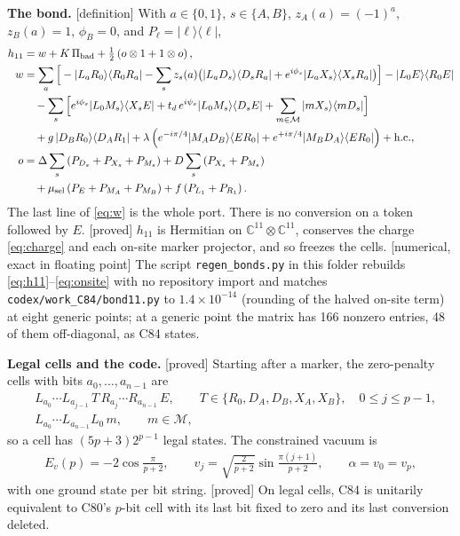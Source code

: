 \documentclass[11pt]{article}
\newcommand{\tg}[1]{\textsf{[#1]}}
\newcommand{\kb}[2]{|#1\rangle\langle #2|}
\newcommand{\repo}[1]{\texttt{#1}}
\begin{document}
\textbf{The bond.} \tg{definition} With $a\in\{0,1\}$, $s\in\{A,B\}$, $z_A(a)=(-1)^a$, $z_B(a)=1$, $\phi_B=0$, and $P_\ell=\kb{\ell}{\ell}$,
\begin{align}
h_{11}&=w+K\,\Pi_{\rm bad}+\tfrac12\left(o\otimes 1+1\otimes o\right),\label{eq:h11}\\
w&=\sum_{a}\Big[-\kb{L_aR_0}{R_0R_a}-\sum_s z_s(a)\big(\kb{L_aD_s}{D_sR_a}+e^{i\phi_s}\kb{L_aX_s}{X_sR_a}\big)\Big]-\kb{L_0E}{R_0E}\nonumber\\
&\quad-\sum_s\Big[e^{i\phi_s}\kb{L_0M_s}{X_sE}+t_d\,e^{i\psi_s}\kb{L_0M_s}{D_sE}+\sum_{m\in\mathcal{M}}\kb{mX_s}{mD_s}\Big]\nonumber\\
&\quad+g\,\kb{D_BR_0}{D_AR_1}+\lambda\left(e^{-i\pi/4}\kb{M_AD_B}{ER_0}+e^{+i\pi/4}\kb{M_BD_A}{ER_0}\right)+\text{h.c.},\label{eq:w}\\
o&=\Delta\sum_s\left(P_{D_s}+P_{X_s}+P_{M_s}\right)+D\sum_s\left(P_{X_s}+P_{M_s}\right)\nonumber\\
&\quad+\mu_{\rm sel}\left(P_E+P_{M_A}+P_{M_B}\right)+f\left(P_{L_1}+P_{R_1}\right).\label{eq:onsite}
\end{align}
The last line of \eqref{eq:w} is the whole port. There is no conversion on a token followed by $E$. \tg{proved} $h_{11}$ is Hermitian on $\mathbb{C}^{11}\otimes\mathbb{C}^{11}$, conserves the charge \eqref{eq:charge} and each on-site marker projector, and so freezes the cells. \tg{numerical, exact in floating point} The script \repo{regen\_bonds.py} in this folder rebuilds \eqref{eq:h11}--\eqref{eq:onsite} with no repository import and matches \repo{codex/work\_C84/bond11.py} to $1.4\times10^{-14}$ (rounding of the halved on-site term) at eight generic points; at a generic point the matrix has 166 nonzero entries, 48 of them off-diagonal, as C84 states.

\textbf{Legal cells and the code.} \tg{proved} Starting after a marker, the zero-penalty cells with bits $a_0,\dots,a_{n-1}$ are
\begin{align}
&L_{a_0}\cdots L_{a_{j-1}}\,T\,R_{a_j}\cdots R_{a_{n-1}}\,E,\qquad T\in\{R_0,D_A,D_B,X_A,X_B\},\quad 0\le j\le p-1,\nonumber\\
&L_{a_0}\cdots L_{a_{n-1}}L_0\,m,\qquad m\in\mathcal{M},\label{eq:words}
\end{align}
so a cell has $(5p+3)2^{p-1}$ legal states. The constrained vacuum is
\begin{align}
E_v(p)=-2\cos\frac{\pi}{p+2},\qquad v_j=\sqrt{\frac{2}{p+2}}\sin\frac{\pi(j+1)}{p+2},\qquad \alpha=v_0=v_p ,\label{eq:vac}
\end{align}
with one ground state per bit string. \tg{proved} On legal cells, C84 is unitarily equivalent to C80's $p$-bit cell with its last bit fixed to zero and its last conversion deleted.
\end{document}
